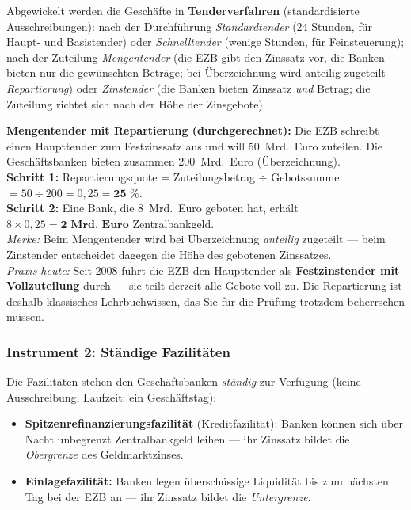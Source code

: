 \documentclass[11pt, a4paper]{article}
\begin{document}
Abgewickelt werden die Geschäfte in \textbf{Tenderverfahren} (standardisierte
Ausschreibungen): nach der Durchführung \emph{Standardtender} (24 Stunden, für Haupt- und
Basistender) oder \emph{Schnelltender} (wenige Stunden, für Feinsteuerung); nach der
Zuteilung \emph{Mengentender} (die EZB gibt den Zinssatz vor, die Banken bieten nur die
gewünschten Beträge; bei Überzeichnung wird anteilig zugeteilt --- \emph{Repartierung})
oder \emph{Zinstender} (die Banken bieten Zinssatz \emph{und} Betrag; die Zuteilung
richtet sich nach der Höhe der Zinsgebote).

\begin{beispiel}
\textbf{Mengentender mit Repartierung (durchgerechnet):} Die EZB schreibt einen
Haupttender zum Festzinssatz aus und will 50~Mrd.~Euro zuteilen. Die Geschäftsbanken
bieten zusammen 200~Mrd.~Euro (Überzeichnung).\\[0.3em]
\textbf{Schritt 1:} Repartierungsquote = Zuteilungsbetrag $\div$ Gebotssumme
$= 50 \div 200 = 0{,}25 = \textbf{25~\%}$.\\
\textbf{Schritt 2:} Eine Bank, die 8~Mrd.~Euro geboten hat, erhält
$8 \times 0{,}25 = \textbf{2~Mrd.~Euro}$ Zentralbankgeld.\\[0.3em]
\emph{Merke:} Beim Mengentender wird bei Überzeichnung \emph{anteilig} zugeteilt ---
beim Zinstender entscheidet dagegen die Höhe des gebotenen Zinssatzes.\\[0.3em]
\emph{Praxis heute:} Seit 2008 führt die EZB den Haupttender als \textbf{Festzinstender
mit Vollzuteilung} durch --- sie teilt derzeit alle Gebote voll zu. Die Repartierung ist
deshalb klassisches Lehrbuchwissen, das Sie für die Prüfung trotzdem beherrschen müssen.
\end{beispiel}

\subsubsection{Instrument 2: Ständige Fazilitäten}

Die Fazilitäten stehen den Geschäftsbanken \emph{ständig} zur Verfügung (keine
Ausschreibung, Laufzeit: ein Geschäftstag):

\begin{itemize}
  \item \textbf{Spitzenrefinanzierungsfazilität} (Kreditfazilität): Banken können sich
    über Nacht unbegrenzt Zentralbankgeld leihen --- ihr Zinssatz bildet die
    \emph{Obergrenze} des Geldmarktzinses.
  \item \textbf{Einlagefazilität:} Banken legen überschüssige Liquidität bis zum nächsten
    Tag bei der EZB an --- ihr Zinssatz bildet die \emph{Untergrenze}.
\end{itemize}
\end{document}

